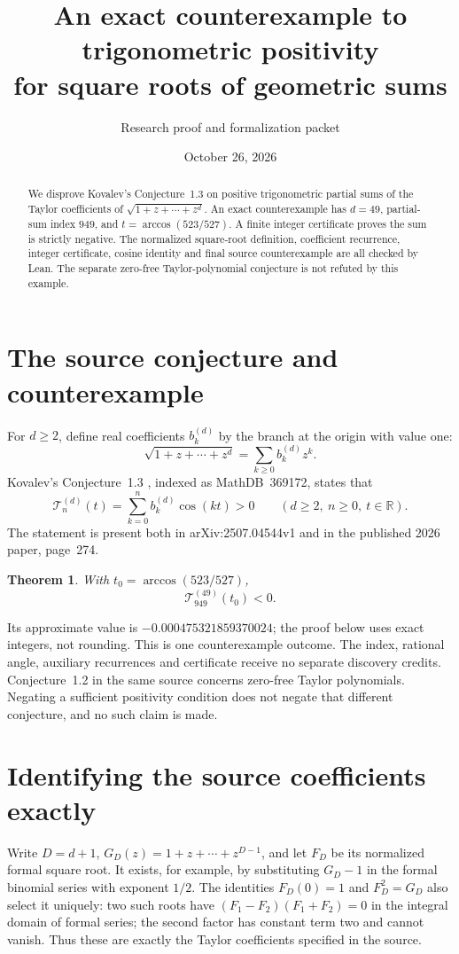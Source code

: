 \documentclass[11pt]{article}
\title{An exact counterexample to trigonometric positivity\\for square roots of geometric sums}
\author{Research proof and formalization packet}
\date{October 26, 2026}
\newtheorem{theorem}{Theorem}
\begin{document}
\maketitle
\begin{abstract}
We disprove Kovalev's Conjecture~1.3 on positive trigonometric partial
sums of the Taylor coefficients of $\sqrt{1+z+\cdots+z^d}$.
An exact counterexample has $d=49$, partial-sum index $949$, and
$t=\arccos(523/527)$. A finite integer certificate proves the sum is
strictly negative. The normalized square-root definition, coefficient
recurrence, integer certificate, cosine identity and final source
counterexample are all checked by Lean. The separate zero-free
Taylor-polynomial conjecture is not refuted by this example.
\end{abstract}

\section{The source conjecture and counterexample}
For $d\geq2$, define real coefficients $b_k^{(d)}$ by the branch at the
origin with value one:
\[
 \sqrt{1+z+\cdots+z^d}=\sum_{k\geq0}b_k^{(d)}z^k.
\]
Kovalev's Conjecture~1.3 \cite{K}, indexed as MathDB~369172, states that
\[
 \mathcal T_n^{(d)}(t)=\sum_{k=0}^n b_k^{(d)}\cos(kt)>0
 \qquad(d\geq2,\ n\geq0,\ t\in\mathbb R).
\]
The statement is present both in arXiv:2507.04544v1 and in the published
2026 paper, page~274.

\begin{theorem}\label{thm:counterexample}
With $t_0=\arccos(523/527)$,
\[
 \mathcal T_{949}^{(49)}(t_0)<0.
\]
\end{theorem}

Its approximate value is $-0.000475321859370024$; the proof below uses
exact integers, not rounding. This is one counterexample outcome. The
index, rational angle, auxiliary recurrences and certificate receive no
separate discovery credits. Conjecture~1.2 in the same source concerns
zero-free Taylor polynomials. Negating a sufficient positivity condition
does not negate that different conjecture, and no such claim is made.

\section{Identifying the source coefficients exactly}
Write $D=d+1$, $G_D(z)=1+z+\cdots+z^{D-1}$, and let $F_D$ be its
normalized formal square root. It exists, for example, by substituting
$G_D-1$ in the formal binomial series with exponent $1/2$.
The identities $F_D(0)=1$ and $F_D^2=G_D$ also select it uniquely:
two such roots have $(F_1-F_2)(F_1+F_2)=0$ in the integral domain of
formal series; the second factor has constant term two and cannot vanish.
Thus these are exactly the Taylor coefficients specified in the source.
\end{document}
